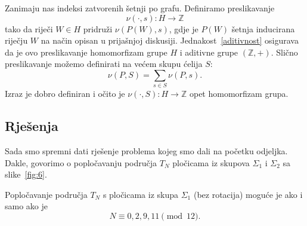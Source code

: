 \documentclass[11pt]{scrartcl}
\begin{document}
Zanimaju nas indeksi zatvorenih šetnji po grafu. Definiramo preslikavanje
\[
\nu(\cdot, s)\colon H\to\mathbb{Z}
\]
tako da riječi $W\in H$ pridruži $\nu(P(W),s)$, gdje je $P(W)$ šetnja inducirana riječju $W$ na način opisan u prijašnjoj diskusiji. Jednakost~\eqref{aditivnost} osigurava da je ovo preslikavanje homomorfizam grupe $H$ i aditivne grupe $(\mathbb{Z},+)$. Slično preslikavanje možemo definirati na većem skupu ćelija $S$:
\[
\nu(P, S) = \sum \limits_{s \in S} \nu(P, s).
\]
Izraz je dobro definiran i očito je $\nu(\cdot,S)\colon H \rightarrow \mathbb{Z}$ opet homomorfizam grupa.

\subsection{Rješenja}
Sada smo spremni dati rješenje problema kojeg smo dali na početku odjeljka. Dakle, govorimo o popločavanju područja $T_N$ pločicama iz skupova $\Sigma_1$ i $\Sigma_2$ sa slike~\ref{fig:6}. 

\begin{teorem} \label{teorem:grupe1}
Popločavanje područja $T_N$ s pločicama iz skupa $\Sigma_1$ (bez rotacija) moguće je ako i samo ako je
\begin{equation} \label{prvi:nuzno}
N \equiv 0, 2, 9, 11 \pmod{12}.
\end{equation}
\end{teorem}
\end{document}
